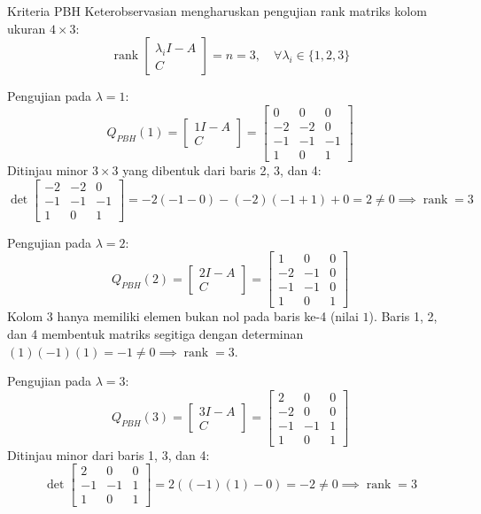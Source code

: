 \documentclass[11pt,a4paper]{article}
\begin{document}
Kriteria PBH Keterobservasian mengharuskan pengujian rank matriks kolom ukuran $4 \times 3$:
$$\operatorname{rank} \begin{bmatrix} \lambda_i I - A \\ C \end{bmatrix} = n = 3, \quad \forall \lambda_i \in \{1, 2, 3\}$$

Pengujian pada $\lambda = 1$:
$$Q_{PBH}(1) = \begin{bmatrix} 1I - A \\ C \end{bmatrix} = \begin{bmatrix} 0 & 0 & 0 \\ -2 & -2 & 0 \\ -1 & -1 & -1 \\ 1 & 0 & 1 \end{bmatrix}$$
Ditinjau minor $3 \times 3$ yang dibentuk dari baris 2, 3, dan 4:
$$\det \begin{bmatrix} -2 & -2 & 0 \\ -1 & -1 & -1 \\ 1 & 0 & 1 \end{bmatrix} = -2(-1 - 0) - (-2)(-1 + 1) + 0 = 2 \ne 0 \implies \operatorname{rank} = 3$$

Pengujian pada $\lambda = 2$:
$$Q_{PBH}(2) = \begin{bmatrix} 2I - A \\ C \end{bmatrix} = \begin{bmatrix} 1 & 0 & 0 \\ -2 & -1 & 0 \\ -1 & -1 & 0 \\ 1 & 0 & 1 \end{bmatrix}$$
Kolom 3 hanya memiliki elemen bukan nol pada baris ke-4 (nilai $1$). Baris 1, 2, dan 4 membentuk matriks segitiga dengan determinan $(1)(-1)(1) = -1 \ne 0 \implies \operatorname{rank} = 3$.

Pengujian pada $\lambda = 3$:
$$Q_{PBH}(3) = \begin{bmatrix} 3I - A \\ C \end{bmatrix} = \begin{bmatrix} 2 & 0 & 0 \\ -2 & 0 & 0 \\ -1 & -1 & 1 \\ 1 & 0 & 1 \end{bmatrix}$$
Ditinjau minor dari baris 1, 3, dan 4:
$$\det \begin{bmatrix} 2 & 0 & 0 \\ -1 & -1 & 1 \\ 1 & 0 & 1 \end{bmatrix} = 2((-1)(1) - 0) = -2 \ne 0 \implies \operatorname{rank} = 3$$
\end{document}
